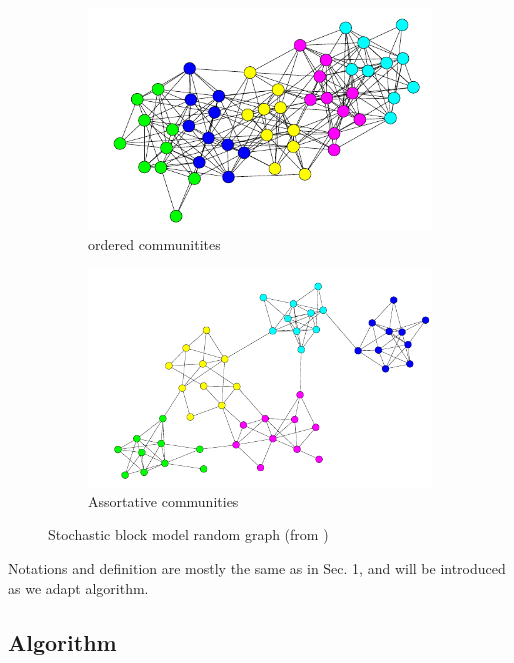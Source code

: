 \documentclass[11pt,a4paper]{article}
\begin{document}
\begin{figure}[ht]
	\centering
	\begin{subfigure}{.49\textwidth}
		\includegraphics[width=\textwidth]{sbm}
		\caption{ordered communitites}
	\end{subfigure}
	\begin{subfigure}{.49\textwidth}
		\includegraphics[width=\textwidth]{assortative}
		\caption{Assortative communities}
	\end{subfigure}
	\caption{Stochastic block model random graph (from \cite{sbm})}
	\label{fig:sbm}
\end{figure}

Notations and definition are mostly the same as in Sec. 1, and will be introduced as we adapt \cite{valko} algorithm. 

\subsection{Algorithm}
\end{document}
